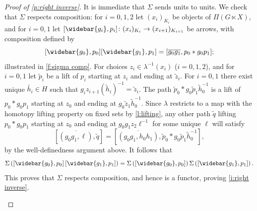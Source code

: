 \documentclass[12pt,reqno]{amsart}
\theoremstyle{plain}
\theoremstyle{definition}
\newcommand{\firstmidarrow}{\tikz \draw[-{angle 90}] (0,0) -- +(.2,.1);}
\begin{document}
\begin{proof}[Proof of \cref{p:right inverse}]
        It is immediate that $\Sigma$ sends units to units.  We check that $\Sigma$ respects composition: for $i=0,1,2$ let $(x_i)_{K_i}$ be objects of $\Pi(G\ltimes X)$, and for $i=0,1$ let $[\widebar{g_i},p_i]\colon (x_i)_{K_i}\to (x_{i+1})_{K_{i+1}}$ be arrows,  with composition defined by  $$[\widebar{g_0},p_0][\widebar{g_1},p_1]=[\overline{g_0g_1},p_0*g_0p_1];$$  illustrated in \cref{f:sigma comp}.  For choices $z_i\in\lambda^{-1}(x_i)$ ($i=0,1,2$), and for $i=0,1$ let $\widetilde{p}_i$ be a lift of $p_i$ starting at $z_i$ and ending at $\widetilde{z}_i$.  For $i=0,1$ there exist unique $\widetilde{h_i}\in H$ such that $g_iz_{i+1}(\widetilde{h}_i)^{-1}=\widetilde{z}_i$.  The path $\widetilde{p}_0*g_0\widetilde{p}_1\widetilde{h}_0^{-1}$ is a lift of $p_0*g_0p_1$ starting at $z_0$ and ending at $g_0\widetilde{z}_1\widetilde{h}_0^{-1}$. Since $\lambda$ restricts to a map with the homotopy lifting property on  fixed sets by \cref{l:lifting}, any other path $\widetilde{q}$ lifting $p_0*g_0p_1$ starting at $z_0$ and ending at $g_0g_1z_2\ell^{-1}$ for some unique $\ell$ will satisfy $$\left[\overline{(g_0g_1,\ell)},\widetilde{q}\right]=\left[\overline{(g_0g_1,h_0h_1)},\widetilde{p}_0*g_0\widetilde{p}_1\widetilde{h}_0^{-1}\right],$$ by the well-definedness argument above.  It follows that        $$\Sigma\left(\left[\widebar{g_0},p_0\right]\left[\widebar{g_1},p_1\right]\right)=\Sigma\left(\left[\widebar{g_0},p_0\right]\right)\Sigma\left(\left[\widebar{g_1},p_1\right]\right).$$
        This proves that $\Sigma$ respects composition, and hence is a functor, proving \cref{i:right inverse}.

        \begin{figure}
        \centering
\end{figure}
\end{proof}
\end{document}
